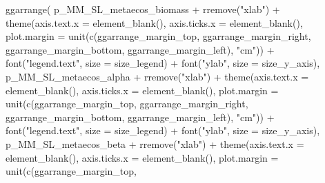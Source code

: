 \documentclass[
]{article}
\newenvironment{Shaded}{\begin{snugshade}}{\end{snugshade}}
\newcommand{\AttributeTok}[1]{\textcolor[rgb]{0.77,0.63,0.00}{#1}}
\newcommand{\FunctionTok}[1]{\textcolor[rgb]{0.00,0.00,0.00}{#1}}
\newcommand{\NormalTok}[1]{#1}
\newcommand{\SpecialCharTok}[1]{\textcolor[rgb]{0.00,0.00,0.00}{#1}}
\newcommand{\StringTok}[1]{\textcolor[rgb]{0.31,0.60,0.02}{#1}}
\begin{document}
\begin{Shaded}
\begin{Highlighting}[]
\FunctionTok{ggarrange}\NormalTok{(}
\NormalTok{  p\_MM\_SL\_metaecos\_biomass }\SpecialCharTok{+}
    \FunctionTok{rremove}\NormalTok{(}\StringTok{"xlab"}\NormalTok{) }\SpecialCharTok{+}
    \FunctionTok{theme}\NormalTok{(}\AttributeTok{axis.text.x =} \FunctionTok{element\_blank}\NormalTok{(),}
          \AttributeTok{axis.ticks.x =} \FunctionTok{element\_blank}\NormalTok{(),}
          \AttributeTok{plot.margin =} \FunctionTok{unit}\NormalTok{(}\FunctionTok{c}\NormalTok{(ggarrange\_margin\_top,}
\NormalTok{                               ggarrange\_margin\_right,}
\NormalTok{                               ggarrange\_margin\_bottom,}
\NormalTok{                               ggarrange\_margin\_left), }
                             \StringTok{"cm"}\NormalTok{)) }\SpecialCharTok{+}
    \FunctionTok{font}\NormalTok{(}\StringTok{"legend.text"}\NormalTok{, }\AttributeTok{size =}\NormalTok{ size\_legend) }\SpecialCharTok{+}
    \FunctionTok{font}\NormalTok{(}\StringTok{"ylab"}\NormalTok{, }\AttributeTok{size =}\NormalTok{ size\_y\_axis),}
\NormalTok{  p\_MM\_SL\_metaecos\_alpha }\SpecialCharTok{+}
    \FunctionTok{rremove}\NormalTok{(}\StringTok{"xlab"}\NormalTok{) }\SpecialCharTok{+}
    \FunctionTok{theme}\NormalTok{(}\AttributeTok{axis.text.x =} \FunctionTok{element\_blank}\NormalTok{(),}
          \AttributeTok{axis.ticks.x =} \FunctionTok{element\_blank}\NormalTok{(),}
          \AttributeTok{plot.margin =} \FunctionTok{unit}\NormalTok{(}\FunctionTok{c}\NormalTok{(ggarrange\_margin\_top,}
\NormalTok{                               ggarrange\_margin\_right,}
\NormalTok{                               ggarrange\_margin\_bottom,}
\NormalTok{                               ggarrange\_margin\_left), }
                             \StringTok{"cm"}\NormalTok{)) }\SpecialCharTok{+}
    \FunctionTok{font}\NormalTok{(}\StringTok{"legend.text"}\NormalTok{, }\AttributeTok{size =}\NormalTok{ size\_legend) }\SpecialCharTok{+}
    \FunctionTok{font}\NormalTok{(}\StringTok{"ylab"}\NormalTok{, }\AttributeTok{size =}\NormalTok{ size\_y\_axis),}
\NormalTok{   p\_MM\_SL\_metaecos\_beta }\SpecialCharTok{+}
    \FunctionTok{rremove}\NormalTok{(}\StringTok{"xlab"}\NormalTok{) }\SpecialCharTok{+}
    \FunctionTok{theme}\NormalTok{(}\AttributeTok{axis.text.x =} \FunctionTok{element\_blank}\NormalTok{(),}
          \AttributeTok{axis.ticks.x =} \FunctionTok{element\_blank}\NormalTok{(),}
          \AttributeTok{plot.margin =} \FunctionTok{unit}\NormalTok{(}\FunctionTok{c}\NormalTok{(ggarrange\_margin\_top,}

\end{Highlighting}
\end{Shaded}
\end{document}
